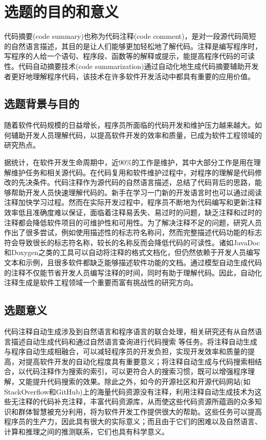 \section{选题的目的和意义}
代码摘要(code summary)也称为代码注释(code comment)，是对一段源代码简短的自然语言描述，其目的是让人们能够更加轻松地了解代码。注释是编写程序时，写程序的人给一个语句、程序段、函数等的解释或提示，能提高程序代码的可读性。代码自动摘要技术(code summarization)通过自动化地生成代码摘要辅助开发者更好地理解程序代码，该技术在许多软件开发活动中都具有重要的应用价值\cite{zsk}。

\subsection{选题背景与目的}
随着软件代码规模的日益增长，程序员所面临的代码开发和维护压力越来越大。如何辅助开发人员理解代码，以提高软件开发的效率和质量，已成为软件工程领域的研究热点\cite{yqf}\cite{hx}。

据统计，在软件开发生命周期中，近90\%的工作是维护，其中大部分工作是用在理解维护任务和相关源代码\cite{nosek1990software}。在代码复用和软件维护过程中，对程序的理解是代码修改的先决条件。代码注释作为源代码的自然语言描述，总结了代码背后的思路，能够帮助开发人员快速理解代码的。新手在学习一门新的开发语言时也可以通过阅读注释加快学习过程。然而在实际开发过程中，程序员不断地为代码编写和更新注释效率低且准确度难以保证，面临着注释易丢失、易过时的问题，缺乏注释和过时的注释都会降低软件项目的可维护性和可用性。为了解决注释不足的问题，研究人员作出了很多尝试，例如使用描述性的标志符名称问，然而完整描述代码功能的标志符会导致很长的标志符名称，较长的名称反而会降低代码的可读性\cite{binkley2008impact}。诸如JavaDoc和Doxygen之类的工具可以自动将注释的格式文档化，但仍然依赖于开发人员编写文本和示例，且很多软件都缺乏能够描述软件功能的文档\cite{lwp}。通过模型自动生成代码的注释不仅能节省开发人员编写注释的时间，同时有助于理解代码。因此，自动化注释生成是软件工程领域一个重要而富有挑战性的研究方向\cite{jz}。

\subsection{选题意义}
代码注释自动生成涉及到自然语言和程序语言的联合处理，相关研究还有从自然语言描述自动生成代码和通过自然语言查询进行代码搜索 \cite{lx} 等任务。将注释自动生成与程序自动生成相融合，可以减轻程序员的开发负担，实现开发效率和质量的提高，对提高软件开发的自动化程度具有重要意义；将注释自动生成与代码搜索相结合，以代码注释作为搜索的索引，可以更符合人的搜索习惯，既可以增强程序理解，又能提升代码搜索的效果。除此之外，如今的开源社区和开源代码网站(如StackOverflow和GitHub)上的海量代码资源没有注释，利用注释自动生成技术为这些无注释的代码补充注释，丰富代码资源库，从而使这些代码资源所蕴涵的众多知识和群体智慧被充分利用，将为软件开发工作提供很大的帮助。这些任务可以提高程序员的生产力，因此具有很大的实际意义；而且由于它们的困难以及自然语言、计算和推理之间的推测联系，它们也具有科学意义\cite{miceli2017parallel}。


